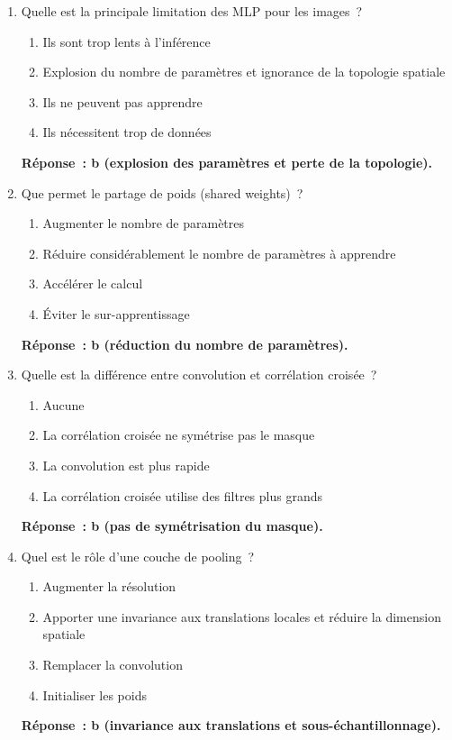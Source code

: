 \documentclass[a4paper,11pt]{article}
\theoremstyle{definition}
\theoremstyle{remark}
\begin{document}
\begin{enumerate}

  \item Quelle est la principale limitation des MLP pour les
    images~?
    \begin{enumerate}
      \item Ils sont trop lents \`a l'inf\'erence
      \item Explosion du nombre de param\`etres et ignorance de la
        topologie spatiale
      \item Ils ne peuvent pas apprendre
      \item Ils n\'ecessitent trop de donn\'ees
    \end{enumerate}
    \textbf{R\'eponse~: b (explosion des param\`etres et perte de
    la topologie).}

  \item Que permet le partage de poids (shared weights)~?
    \begin{enumerate}
      \item Augmenter le nombre de param\`etres
      \item R\'eduire consid\'erablement le nombre de param\`etres
        \`a apprendre
      \item Acc\'el\'erer le calcul
      \item \'Eviter le sur-apprentissage
    \end{enumerate}
    \textbf{R\'eponse~: b (r\'eduction du nombre de param\`etres).}

  \item Quelle est la diff\'erence entre convolution et
    corr\'elation crois\'ee~?
    \begin{enumerate}
      \item Aucune
      \item La corr\'elation crois\'ee ne sym\'etrise pas le masque
      \item La convolution est plus rapide
      \item La corr\'elation crois\'ee utilise des filtres plus
        grands
    \end{enumerate}
    \textbf{R\'eponse~: b (pas de sym\'etrisation du masque).}

  \item Quel est le r\^ole d'une couche de pooling~?
    \begin{enumerate}
      \item Augmenter la r\'esolution
      \item Apporter une invariance aux translations locales et
        r\'eduire la dimension spatiale
      \item Remplacer la convolution
      \item Initialiser les poids
    \end{enumerate}
    \textbf{R\'eponse~: b (invariance aux translations et
    sous-\'echantillonnage).}


\end{enumerate}
\end{document}
